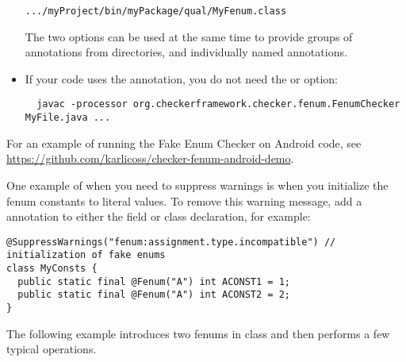 \begin{itemize}
\begin{alltt}
  .../myProject/bin/myPackage/qual/MyFenum.class
\end{alltt}

The two options can be used at the same time to provide groups of annotations
from directories, and individually named annotations.

\item
If your code uses the  annotation, you do
not need the  or  option:

\begin{Verbatim}
  javac -processor org.checkerframework.checker.fenum.FenumChecker MyFile.java ...
\end{Verbatim}

\end{itemize}

For an example of running the Fake Enum Checker on Android code, see
\url{https://github.com/karlicoss/checker-fenum-android-demo}.



One example of when you need to suppress warnings is when you initialize the
fenum constants to literal values.
To remove this warning message, add a  annotation to either
the field or class declaration, for example:

\begin{Verbatim}
@SuppressWarnings("fenum:assignment.type.incompatible") // initialization of fake enums
class MyConsts {
  public static final @Fenum("A") int ACONST1 = 1;
  public static final @Fenum("A") int ACONST2 = 2;
}
\end{Verbatim}




The following example introduces two fenums in class 
and then performs a few typical operations.

